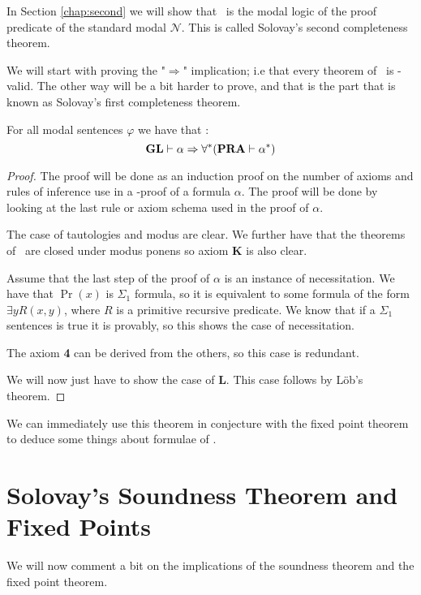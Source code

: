 \documentclass[../main.tex]{subfiles}
\begin{document}
In Section \ref{chap:second} we will show that \GLS\ is the modal logic of the proof
predicate of the standard modal $\mathcal{N}$. This is called Solovay's second completeness theorem.

We will start with proving the "$\Rightarrow$" implication; i.e that every
theorem of \GL\ is \PRA-valid. The other way will be a bit harder to prove, and
that is the part that is known as Solovay's first completeness theorem.
\begin{thm}[Soundness]
	For all modal sentences $\varphi$ we have that :
	$$\text{\textbf{GL}}\vdash\alpha\Rightarrow\forall ^*(\text{\textbf{PRA}}\vdash\alpha^*)$$
\end{thm}
\begin{proof}
	The proof will be done as an induction proof on the number of axioms
	and rules of inference use in a \GL-proof of a formula $\alpha$. The
	proof will be done by looking at the last rule or axiom schema used in
	the proof of $\alpha$.

	The case of tautologies and modus are clear. We further have that the theorems of
	\PRA\ are closed under modus ponens so axiom \textbf{K} is also clear. 

	Assume that  the last step of the proof of $\alpha$ is an instance of
	necessitation. We have that $\Pr(x)$ is $\Sigma_1$ formula, so it is equivalent to
	some formula of the form $\exists y R(x,y)$, where $R$ is a primitive
	recursive predicate. We know that if a $\Sigma_1$ sentences is true it
	is provably, so this shows the case of necessitation.

	The axiom \textbf{4} can be derived from the others, so this case is redundant.

	We will now just have to show the case of \textbf{L}. This case follows by
	Löb's theorem.
\end{proof}
We can immediately use this theorem in conjecture with the fixed point theorem
to deduce some things about formulae of \PRA.
\section{Solovay's Soundness Theorem and Fixed Points}

We will now comment a bit on the implications of the soundness theorem and
the fixed point theorem.
\end{document}
